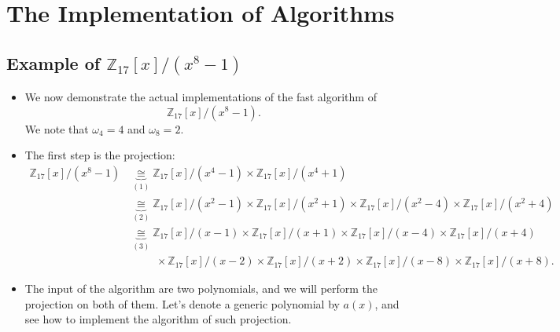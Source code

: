 \section{The Implementation of Algorithms}
\subsection{Example of \( \mathbb{Z}_{17}[x]/(x^{8}-1) \)}

\begin{frame}
    \begin{itemize}
        \item We now demonstrate the actual implementations of the fast algorithm of 
        \[ \mathbb{Z}_{17}[x]/(x^{8}-1). \]
        We note that \( \omega_{4} = 4\) and \( \omega_{8} = 2 \).
        \item The first step is the projection:
        \begin{align*}
            \mathbb{Z}_{17}[x]/(x^{8}-1) &\underbrace{\cong}_{(1)} \mathbb{Z}_{17}[x]/(x^{4}-1) \times \mathbb{Z}_{17}[x]/(x^{4}+1) \\
            &\underbrace{\cong}_{(2)} \mathbb{Z}_{17}[x]/(x^{2}-1) \times \mathbb{Z}_{17}[x]/(x^{2}+1) \times \mathbb{Z}_{17}[x]/(x^{2}-4) \times \mathbb{Z}_{17}[x]/(x^{2}+4) \\
            &\underbrace{\cong}_{(3)} \mathbb{Z}_{17}[x]/(x-1) \times \mathbb{Z}_{17}[x]/(x+1) \times \mathbb{Z}_{17}[x]/(x-4) \times \mathbb{Z}_{17}[x]/(x+4) \\
            &\hspace{1cm} \times \mathbb{Z}_{17}[x]/(x-2) \times \mathbb{Z}_{17}[x]/(x+2) \times \mathbb{Z}_{17}[x]/(x-8) \times \mathbb{Z}_{17}[x]/(x+8).
        \end{align*}
        \item The input of the algorithm are two polynomials, and we will perform the projection on both of them.
        Let's denote a generic polynomial by \( a(x) \), and see how to implement the algorithm of such projection.

    \end{itemize}
\end{frame}

